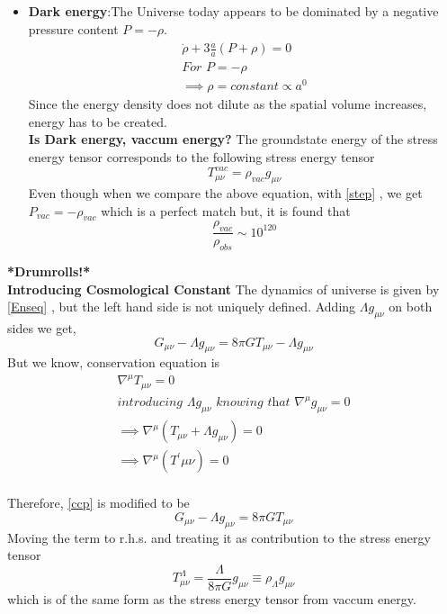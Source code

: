 \documentclass[12pt]{report}
\newcommand{\tbf}[1]{\textbf{#1}}
\newcommand{\tit}[1]{\textit{#1}}
\begin{document}
\begin{itemize}
 \item \tbf{Dark energy}:The Universe today appears to be dominated by a negative pressure content $P=-\rho$.
 \begin{eqnarray*}
 \dot{\rho}+3\frac{\dot{a}}{a}(P+\rho)=0\\
 \tit{For $P=-\rho$}\\
 \implies \rho= \tit{constant} \propto a^0
 \end{eqnarray*}
 Since the energy density does not dilute as the spatial volume increases, energy has to be created.\\
 \tbf{Is Dark energy, vaccum energy?}
 The groundstate energy of the stress energy tensor corresponds to the following stress energy tensor
 \begin{equation*}
 T_{\mu \nu}^{vac}=\rho_{vac}g_{\mu \nu}
 \end{equation*}
 Even though when we compare the above equation, with \eqref{step} , we get $P_{vac}= -\rho_{vac}$ which is a perfect match but, it is found that
 \begin{equation*}
 \frac{\rho_{vac}}{\rho_{obs}} \sim 10^{120}
 \end{equation*}
 
\end{itemize}

\tbf{*Drumrolls!* }\\
\tbf{Introducing Cosmological Constant}
The dynamics of universe is given by \eqref{Enseq} , but the left hand side is not uniquely defined. Adding $\Lambda g_{\mu \nu}$ on both sides we get,
\begin{equation}\label{ccp}
G_{\mu \nu} - \Lambda g_{\mu \nu}= 8 \pi G T_{\mu \nu}- \Lambda g_{\mu \nu}
\end{equation}
But we know, conservation equation is 
\begin{eqnarray*}
\nabla^{\mu}T_{\mu \nu}=0\\
\tit{introducing $\Lambda g_{\mu \nu} $ knowing that  $\nabla^\mu g_{\mu \nu}=0$}\\
\implies \nabla^{\mu}(T_{\mu \nu}+\Lambda g_{\mu \nu})=0\\
\implies \nabla^{\mu}(T^\prime{\mu \nu})=0\\
\end{eqnarray*}

Therefore, \eqref{ccp} is modified to be 
\begin{equation}
G_{\mu \nu} - \Lambda g_{\mu \nu}= 8 \pi G T_{\mu \nu}
\end{equation}
Moving the term to r.h.s. and treating it as contribution to the stress energy tensor
\begin{equation}
T_{\mu \nu}^{\Lambda}=\frac{\Lambda}{8 \pi G}g_{\mu \nu}\equiv \rho_{\Lambda}g_{\mu \nu}
\end{equation}
which is of the same form as the stress energy tensor from vaccum energy. \\
\end{document}
